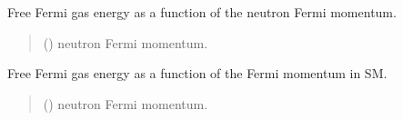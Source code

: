 \documentclass[letterpaper,10pt,english]{sphinxmanual}
\begin{document}

\begin{fulllineitems}
\label{\detokenize{source/api/setup_eos_ffg:nucleardatapy.setup_eos_ffg.effg_NM}}
\pysigstartsignatures
\pysiglinewithargsret
{}
{}
{}
\pysigstopsignatures
\sphinxAtStartPar
Free Fermi gas energy as a function of the neutron Fermi momentum.
\begin{quote}\begin{description}
\sphinxAtStartPar
{} () \textendash{} neutron Fermi momentum.

\end{description}\end{quote}

\end{fulllineitems}


\begin{fulllineitems}
\label{\detokenize{source/api/setup_eos_ffg:nucleardatapy.setup_eos_ffg.effg_SM}}
\pysigstartsignatures
\pysiglinewithargsret
{}
{}
{}
\pysigstopsignatures
\sphinxAtStartPar
Free Fermi gas energy as a function of the Fermi momentum in SM.
\begin{quote}\begin{description}
\sphinxAtStartPar
{} () \textendash{} neutron Fermi momentum.

\end{description}\end{quote}

\end{fulllineitems}
\end{document}
